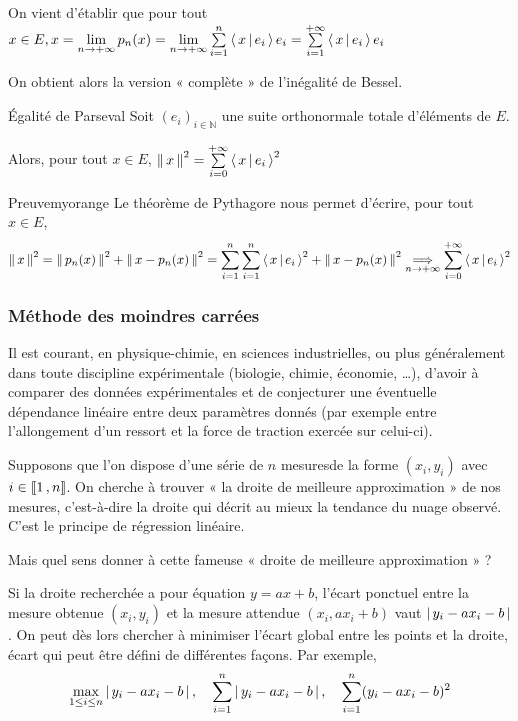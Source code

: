     On vient d’établir que pour tout $x \in E, x = \lim\limits_{n \rightarrow +\infty} p_n(x) = \lim\limits_{n \rightarrow +\infty} \sum\limits_{i =1}^n \left<\,x\,\middle|\,e_i\,\right> e_i = \sum\limits_{i =1}^{+\infty} \left<\,x\,\middle|\,e_i\,\right> e_i$

    On obtient alors la version « complète » de l’inégalité de Bessel.

    \begin{coro}{Égalité de Parseval}{}
        Soit $(e_i)_{i \in \mathbb{N}}$ une suite orthonormale totale d’éléments de $E$.

        Alors, pour tout $x \in E$, $\left\lVert \,x \, \right\rVert^2 = \sum\limits_{i=0}^{+\infty} \left<\,x\,\middle|\,e_i\,\right>^2$
    \end{coro}

    \begin{demo}{Preuve}{myorange}
        Le théorème de Pythagore nous permet d’écrire, pour tout $x \in E$, 
        \[ \left\lVert \,x \, \right\rVert^2 = \left\lVert \,p_n(x) \, \right\rVert^2 + \left\lVert \,x - p_n(x) \, \right\rVert^2 = \sum\limits_{i = 1}^n \sum\limits_{i =1}^n \left<\,x\,\middle|\,e_i\,\right>^2 + \left\lVert \,x - p_n(x) \, \right\rVert^2 \underset{n \rightarrow + \infty}{\Longrightarrow} \sum\limits_{i=0}^{+\infty} \left<\,x\,\middle|\,e_i\,\right>^2 \]
    \end{demo}

    \subsubsection{Méthode des moindres carrées}

    Il est courant, en physique-chimie, en sciences industrielles, ou plus généralement dans toute discipline expérimentale (biologie, chimie, économie, \ldots), d’avoir à comparer des données expérimentales et de conjecturer une éventuelle dépendance linéaire entre deux paramètres donnés (par exemple entre l’allongement d’un ressort et la force de traction exercée sur celui-ci).

    Supposons que l’on dispose d’une série de $n$ mesuresde la forme $(x_i,y_i)$ avec $i \in \left\llbracket 1 \, , n \right\rrbracket$. On cherche à trouver « la droite de meilleure approximation » de nos mesures, c’est-à-dire la droite qui décrit au mieux la tendance du nuage observé. C’est le principe de régression linéaire.

    Mais quel sens donner à cette fameuse « droite de meilleure approximation » ?

    Si la droite recherchée a pour équation $y = ax + b$, l’écart ponctuel entre la mesure obtenue $(x_i,y_i)$ et la mesure attendue $(x_i, ax_i + b)$ vaut $\left\lvert \,y_i -ax_i - b \, \right\rvert$. On peut dès lors chercher à minimiser l’écart global entre les points et la droite, écart qui peut être défini de différentes façons. Par exemple, 
    \[ \max_{1 \leq i \leq n} \left\lvert \,y_i - ax_i - b \, \right\rvert, \quad \sum\limits_{i=1}^n \left\lvert \,y_i -ax_i - b \, \right\rvert, \quad \sum\limits_{i=1}^n (y_i -ax_i -b)^2 \] 

